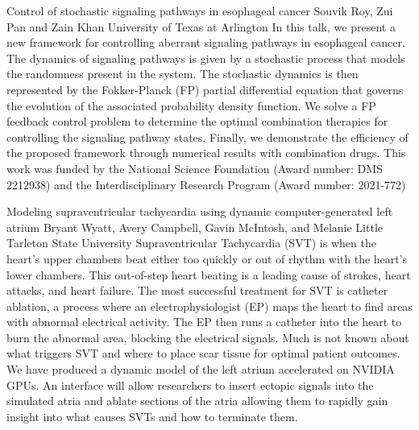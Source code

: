\begin{addmargin}[2em]{0em}
\vspace{1.5ex}
\abs
{Control of stochastic signaling pathways in esophageal cancer}
{Souvik Roy, Zui Pan and Zain Khan}
{University of Texas at Arlington}
{In this talk, we present a new framework for controlling aberrant signaling pathways in esophageal cancer. The dynamics of signaling pathways is given by a stochastic process that models the randomness present in the system. The stochastic dynamics is then represented by the Fokker-Planck (FP) partial differential equation that governs the evolution of the associated probability density function. We solve a FP feedback control problem to determine the optimal combination therapies for controlling the signaling pathway states. Finally, we demonstrate the efficiency of the proposed framework through numerical results with combination drugs. This work was funded by the National Science Foundation (Award number: DMS 2212938) and the Interdisciplinary Research Program (Award number: 2021-772)}


\vspace{1.5ex}
\abs
{Modeling supraventricular tachycardia using dynamic computer-generated left atrium}
{Bryant Wyatt, Avery Campbell, Gavin McIntosh, and Melanie Little}
{Tarleton State University}
{Supraventricular Tachycardia (SVT) is when the heart’s upper chambers beat either too quickly or out of rhythm with the heart’s lower chambers. This out-of-step heart beating is a leading cause of strokes, heart attacks, and heart failure. The most successful treatment for SVT is catheter ablation, a process where an electrophysiologist (EP) maps the heart to find areas with abnormal electrical activity. The EP then runs a catheter into the heart to burn the abnormal area, blocking the electrical signals. Much is not known about what triggers SVT and where to place scar tissue for optimal patient outcomes. We have produced a dynamic model of the left atrium accelerated on NVIDIA GPUs. An interface will allow researchers to insert ectopic signals into the simulated atria and ablate sections of the atria allowing them to rapidly gain insight into what causes SVTs and how to terminate them.}



\end{addmargin}

